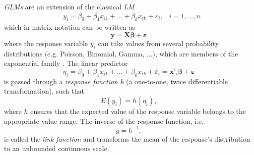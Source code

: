 \textit{\acp{GLM}} are an extension of the classical \textit{\ac{LM}}
\begin{equation}
\begin{aligned}
&y_{i}=\beta_{0}+\beta_{1} x_{i 1}+\ldots+\beta_{k} x_{i k}+\varepsilon_{i}, &i=1, \ldots, n
\end{aligned}
\end{equation}
which in matrix notation can be written as
\begin{equation}
 \bm{y} = \bm{X}\bm{\beta} + \bm{\varepsilon} 
\end{equation}
where the response variable $y_i$ can take values from several probability distributions (e.g. Poisson, Binomial, Gamma, ...), which are members of the exponential family \citep{fahrmeir2003regression}. The linear predictor 
\begin{equation} 
\eta_i = \beta_{0}+\beta_{1} x_{i 1}+\ldots+\beta_{k} x_{i k}+\varepsilon_{i} = \bm{x'}_i \bm{\beta} + \bm{\varepsilon}
\label{eq:linear_predictor_glm}
\end{equation}
is passed through a \textit{response function h} (a one-to-one, twice differentiable transformation), such that
\begin{equation}
 E(y_i) = h(\eta_i),
\label{eq:response_function}
\end{equation}
where $h$ ensures that the expected value of the response variable belongs to the appropriate value range. The inverse of the response function, i.e.
\begin{equation}
g = h^{-1},
\label{eq:link_function}
\end{equation} 
is called the \textit{link function} and transforms the mean of the response's distribution to an unbounded continuous scale.




